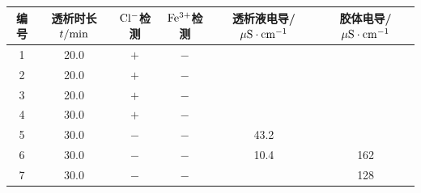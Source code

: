 \documentclass[12pt]{article}
\begin{document}
			 \begin{table}[h]
				\centering
				\begin{tabular}{cccccc}
					\toprule
					编号 & 透析时长$t/{\rm min}$ & ${\rm Cl^{-}}$检测 & ${\rm Fe^{3+}}$检测 & 透析液电导/${\rm \mu S\cdot cm^{-1}}$ & 胶体电导/${\rm \mu S\cdot cm^{-1}}$  \\
					\midrule
					1 & 20.0 & $+$ & $-$ &  & \\
					2 & 20.0 & $+$ & $-$ &  &\\
					3 & 20.0 & $+$ & $-$ &  &\\
					4 & 30.0 & $+$ & $-$ &  &\\
					5 & 30.0 &$-$ & $-$& 43.2 &\\
					6 & 30.0 &$-$ & $-$& 10.4 & 162\\
					7 & 30.0 &$-$ & $-$& & 128\\
					\bottomrule
				\end{tabular}
			\end{table}
			\par
\end{document}
